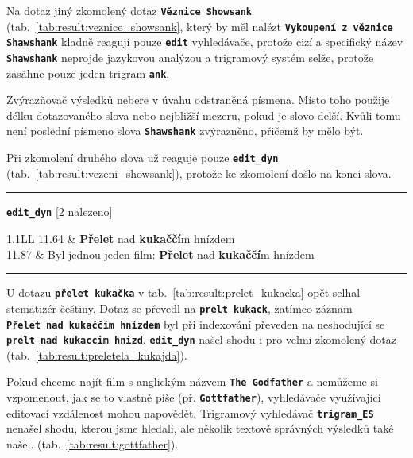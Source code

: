 \documentclass[11pt,letterpaper,oneside,openright]{book}
\newcommand{\bftt}[1]{\texttt{\textbf{#1}}}
\newcommand{\boldred}[1]{\textbf{\color{red} #1}}
\newcommand{\horizlina}%
{
    \mbox{}\vspace{1em}
    \hrule
    \mbox{}
}
\begin{document}
Na dotaz jiný zkomolený dotaz \bftt{Věznice Showsank}
(tab.~\ref{tab:result:veznice_showsank}, který by měl nalézt
\bftt{Vykoupení z věznice Shawshank} kladně reagují pouze \bftt{edit}
vyhledávače, protože cizí a specifický název \bftt{Shawshank} neprojde
jazykovou analýzou a trigramový systém selže, protože zasáhne pouze jeden
trigram \bftt{ank}.

Zvýrazňovač výsledků nebere v úvahu odstraněná písmena. Místo toho použije
délku dotazovaného slova nebo nejbližší mezeru, pokud je slovo delší. Kvůli
tomu není poslední písmeno slova \bftt{Shawshank} zvýrazněno, přičemž by mělo
být.

\mbox{}\mbox{}

Při zkomolení druhého slova už reaguje pouze \bftt{edit\_dyn}
(tab.~\ref{tab:result:vezeni_showsank}), protože ke zkomolení došlo na
konci slova.

\mbox{}\mbox{}

\begin{table}[H]
\begin{tt}
\horizlina

\bftt{edit\_dyn} [2 nalezeno]\vspace{5pt}

\begin{tabulary}{1.1\textwidth}{LL}
11.64 & \boldred{Přelet} nad \boldred{kukaččí}m hnízdem \\
11.87 & Byl jednou jeden film: \boldred{Přelet} nad \boldred{kukaččí}m hnízdem \\
\end{tabulary}
\horizlina

\end{tt}
\caption{Výsledek dotazu \bftt{Přeletěla kukajda}}
\label{tab:result:preletela_kukajda}
\end{table}

U dotazu \bftt{přelet~kukačka} v tab.~\ref{tab:result:prelet_kukacka} opět
selhal stematizér češtiny. Dotaz se převedl na \bftt{prelt~kukack}, zatímco
záznam \bftt{Přelet~nad~kukaččím~hnízdem} byl při indexování převeden na
neshodující se \bftt{prelt~nad~kukaccim~hnizd}. \bftt{edit\_dyn} našel shodu i
pro velmi zkomolený dotaz (tab.~\ref{tab:result:preletela_kukajda}).

\mbox{}\mbox{}

Pokud chceme najít film s anglickým názvem \bftt{The Godfather} a nemůžeme si
vzpomenout, jak se to vlastně píše (př. \bftt{Gottfather}), vyhledávače
využívající editovací vzdálenost mohou napovědět. Trigramový vyhledávač
\bftt{trigram\_ES} nenašel shodu, kterou jsme hledali, ale několik textově
správných výsledků také našel.  (tab.~\ref{tab:result:gottfather}).
\end{document}
